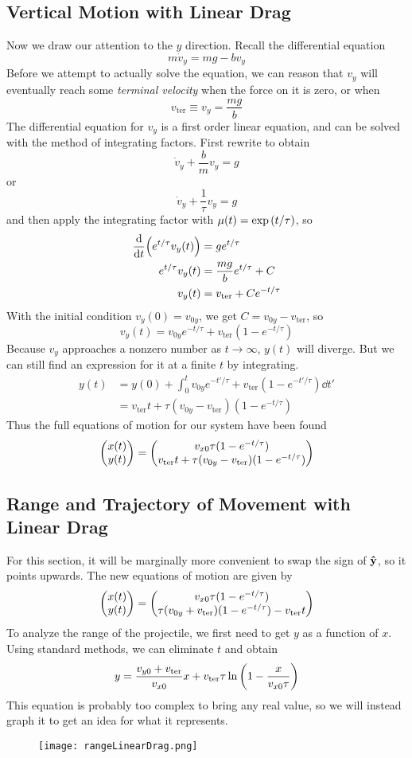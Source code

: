 \subsection*{Vertical Motion with Linear Drag}
Now we draw our attention to the $y$ direction. Recall the differential equation
\[ m\dot v_y = mg - bv_y\]
Before we attempt to actually solve the equation, we can reason that $v_y$ will eventually reach some \textit{terminal velocity} when the force on it is zero, or when
\[ v_{\text{ter}} \equiv v_y = \frac{mg}{b} \]
The differential equation for $v_y$ is a first order linear equation, and can be solved with the method of integrating factors. First rewrite to obtain
\[ \dot v_y + \frac{b}{m}v_y = g \]
or
\[ \dot v_y + \frac{1}{\tau}v_y = g\]
and then apply the integrating factor with $\mu(t) = \exp\pqty{t/\tau}$, so
\begin{align*}
    \dv{t}\pqty{e^{t/\tau}v_y(t)} &= ge^{t/\tau} \\
    e^{t/\tau}v_y(t) &= \frac{mg}{b}e^{t/\tau} + C \\
    v_y(t) &= v_{\text{ter}} + Ce^{-t/\tau}
\end{align*}
With the initial condition $v_y(0)= v_{0y}$, we get $C = v_{0y}-v_{\text{ter}}$, so
\[ v_y(t) = v_{0y}e^{-t/\tau} + v_{\text{ter}}(1 - e^{-t/\tau}) \]
Because $v_y$ approaches a nonzero number as $t\to\infty$, $y(t)$ will diverge. But we can still find an expression for it at a finite $t$ by integrating.
\begin{align*}
    y(t) &= y(0) + \int_0^tv_{0y}e^{-t'/\tau} + v_{\text{ter}}(1 - e^{-t'/\tau})\dd t' \\
    &= v_{\text{ter}}t + \tau(v_{0y}-v_{\text{ter}})(1-e^{-t/\tau})
\end{align*}
Thus the full equations of motion for our system have been found
\[ \begin{pmatrix}x(t) \\ y(t)\end{pmatrix} = \begin{pmatrix} v_{x0}\tau (1-e^{-t/\tau}) \\ v_{\text{ter}}t + \tau(v_{0y}-v_{\text{ter}})(1-e^{-t/\tau})\end{pmatrix}\]
\subsection*{Range and Trajectory of Movement with Linear Drag}
For this section, it will be marginally more convenient to swap the sign of $\mathbf{\hat{y}}$, so it points upwards. The new equations of motion are given by
\[ \begin{pmatrix}x(t) \\ y(t)\end{pmatrix} = \begin{pmatrix} v_{x0}\tau (1-e^{-t/\tau}) \\  \tau(v_{0y}+v_{\text{ter}})(1-e^{-t/\tau}) - v_{\text{ter}}t\end{pmatrix}\]
To analyze the range of the projectile, we first need to get $y$ as a function of $x$. Using standard methods, we can eliminate $t$ and obtain
\begin{equation} \label{yofx_airres}
     y = \frac{v_{y0} + v_{\text{ter}}}{v_{x0}}x + v_{\text{ter}}\tau\ln\pqty{1 - \frac{x}{v_{x0}\tau}}
\end{equation}
This equation is probably too complex to bring any real value, so we will instead graph it to get an idea for what it represents.
\begin{figure}[h!]
    \centering
    \texttt{[image: rangeLinearDrag.png]}
\end{figure}

